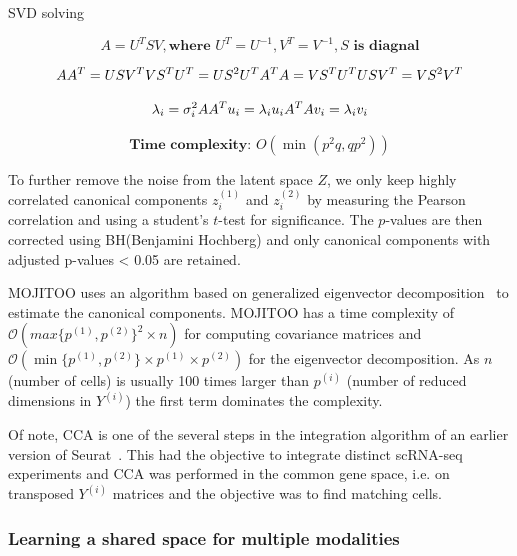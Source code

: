 SVD solving

$$
A=U^TSV, \textbf{where } U^T=U^{-1}, V^T=V^{-1}, S\textbf{ is diagnal}
$$


$$
AA^T=USV^TVS^TU^T=US^2U^T\\
A^TA=VS^TU^TUSV^T=VS^2V^T
$$

$$
\lambda_i=\sigma_i^2\\
AA^Tu_i = \lambda_i u_i\\
A^TAv_i = \lambda_i v_i
$$

$$
\textbf{Time complexity: }O(\min(p^2q,qp^2))
$$





To further remove the noise from the latent space $Z$, we only keep highly correlated canonical components $z_i^{(1)}$ and $z_i^{(2)}$ by measuring the Pearson correlation and using a student's $t$-test for significance. The $p$-values are then corrected using BH(Benjamini Hochberg)\cite{benjamini1995controlling} and only canonical components with adjusted p-values < 0.05 are retained. 

MOJITOO uses an algorithm based on generalized eigenvector decomposition~\cite{Ramsay97functionaldata} to estimate the canonical components. MOJITOO has a time complexity of $\mathcal{O}(max\{p^{(1)},p^{(2)}\}^{2} \times n)$ for computing covariance matrices and $\mathcal{O}(\min\{p^{(1)},p^{(2)}\}\times p^{(1)}\times p^{(2)})$ for the eigenvector decomposition. As $n$ (number of cells) is usually 100 times larger than $p^{(i)}$ (number of reduced dimensions in $Y^{(i)}$) the first term dominates the complexity. 

Of note, CCA is one of the several steps in the integration algorithm of an earlier version of Seurat~\cite{butler2018integrating}. This had the objective to integrate distinct scRNA-seq experiments and CCA was performed in the common gene space, i.e. on transposed $Y^{(i)}$ matrices and the objective was to find matching cells.

\subsubsection{Learning a shared space for multiple modalities}

